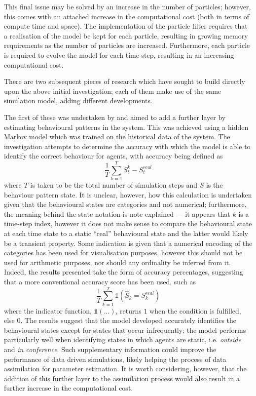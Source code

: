 This final issue may be solved by an increase in the number of particles;
however, this comes with an attached increase  in the computational cost (both
in terms of compute time and space).
The implementation of the particle filter requires that a realisation of the
model be kept for each particle, resulting in growing memory requirements as
the number of particles are increased.
Furthermore, each particle is required to evolve the model for each time-step,
resulting in an increasing computational cost.

There are two subsequent pieces of research which have sought to build directly
upon the above initial investigation; each of them make use of the same
simulation model, adding different developments.

The first of these was undertaken by \citet{rai2013behavior} and aimed to add a
further layer by estimating behavioural patterns in the system.
This was achieved using a hidden Markov model which was trained on the
historical data of the system.
The investigation attempts to determine the accuracy with which the model
is able to identify the correct behaviour for agents, with accuracy being
defined as
\begin{equation}
    \frac{1}{T} \sum_{k=1}^T S_{t}^{k} - S_{t}^{real}
\end{equation}
where $T$ is taken to be the total number of simulation steps and $S$ is the
behaviour pattern state.
It is unclear, however, how this calculation is undertaken given that the
behavioural states are categories and not numerical; furthermore, the meaning
behind the state notation is note explained --- it appears that $k$ is a time-step
index, however it does not make sense to compare the behavioural state at each
time state to a static ``real'' behavioural state and the latter would likely be
a transient property.
Some indication is given that a numerical encoding of the categories has been
used for visualisation purposes, however this should not be used for arithmetic
purposes, nor should any ordinality be inferred from it.
Indeed, the results presented take the form of accuracy percentages, suggesting
that a more conventional accuracy score has been used, such as
\begin{equation}
    \frac{1}{T} \sum_{k=1}^{T} \mathds{1} \left(
                \hat{S}_k = S_{k}^{real} \right)
\end{equation}
where the indicator function, $\mathds{1} \left( \ldots \right)$, returns $1$
when the condition is fulfilled, else $0$.
The results suggest that the model developed accurately identifies the
behavioural states except for states that occur infrequently; the model performs
particularly well when identifying states in which agents are static, i.e.
\textit{outside} and \textit{in conference}.
Such supplementary information could improve the performance of data driven
simulations, likely helping the process of data assimilation for parameter
estimation.
It is worth considering, however, that the addition of this further layer to the
assimilation process would also result in a further increase in the
computational cost.

